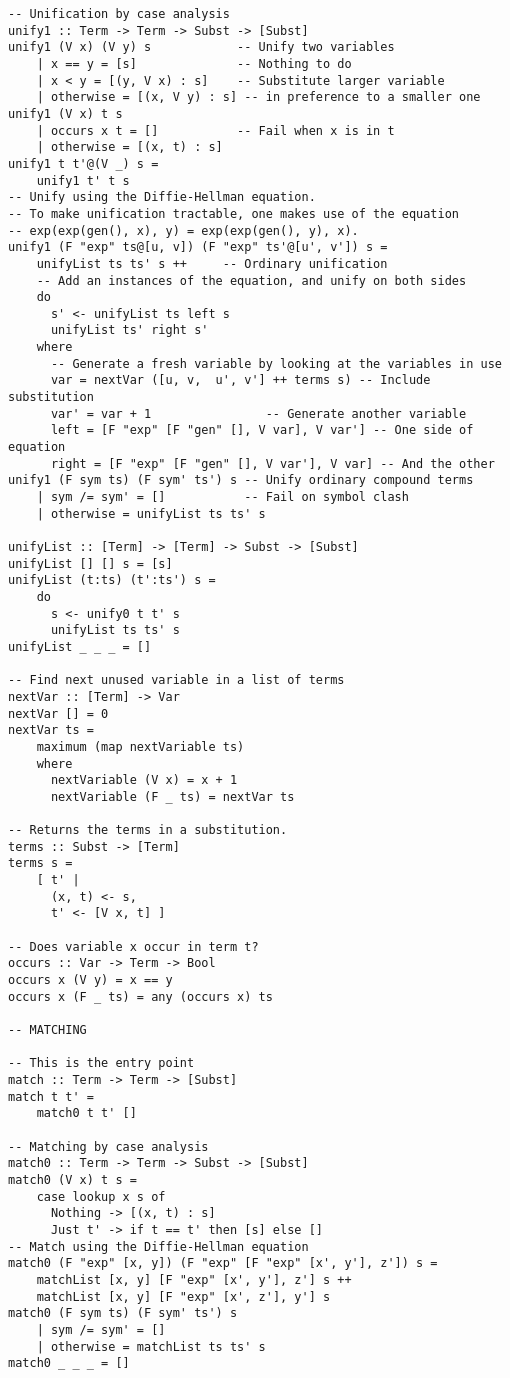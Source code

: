 \documentclass[12pt]{article}
\begin{document}
\begin{verbatim}
-- Unification by case analysis
unify1 :: Term -> Term -> Subst -> [Subst]
unify1 (V x) (V y) s            -- Unify two variables
    | x == y = [s]              -- Nothing to do
    | x < y = [(y, V x) : s]    -- Substitute larger variable
    | otherwise = [(x, V y) : s] -- in preference to a smaller one
unify1 (V x) t s
    | occurs x t = []           -- Fail when x is in t
    | otherwise = [(x, t) : s]
unify1 t t'@(V _) s =
    unify1 t' t s
-- Unify using the Diffie-Hellman equation.
-- To make unification tractable, one makes use of the equation
-- exp(exp(gen(), x), y) = exp(exp(gen(), y), x).
unify1 (F "exp" ts@[u, v]) (F "exp" ts'@[u', v']) s =
    unifyList ts ts' s ++     -- Ordinary unification
    -- Add an instances of the equation, and unify on both sides
    do
      s' <- unifyList ts left s
      unifyList ts' right s'
    where
      -- Generate a fresh variable by looking at the variables in use
      var = nextVar ([u, v,  u', v'] ++ terms s) -- Include  substitution
      var' = var + 1                -- Generate another variable
      left = [F "exp" [F "gen" [], V var], V var'] -- One side of equation
      right = [F "exp" [F "gen" [], V var'], V var] -- And the other
unify1 (F sym ts) (F sym' ts') s -- Unify ordinary compound terms
    | sym /= sym' = []           -- Fail on symbol clash
    | otherwise = unifyList ts ts' s

unifyList :: [Term] -> [Term] -> Subst -> [Subst]
unifyList [] [] s = [s]
unifyList (t:ts) (t':ts') s =
    do
      s <- unify0 t t' s
      unifyList ts ts' s
unifyList _ _ _ = []

-- Find next unused variable in a list of terms
nextVar :: [Term] -> Var
nextVar [] = 0
nextVar ts =
    maximum (map nextVariable ts)
    where
      nextVariable (V x) = x + 1
      nextVariable (F _ ts) = nextVar ts

-- Returns the terms in a substitution.
terms :: Subst -> [Term]
terms s =
    [ t' |
      (x, t) <- s,
      t' <- [V x, t] ]

-- Does variable x occur in term t?
occurs :: Var -> Term -> Bool
occurs x (V y) = x == y
occurs x (F _ ts) = any (occurs x) ts

-- MATCHING

-- This is the entry point
match :: Term -> Term -> [Subst]
match t t' =
    match0 t t' []

-- Matching by case analysis
match0 :: Term -> Term -> Subst -> [Subst]
match0 (V x) t s =
    case lookup x s of
      Nothing -> [(x, t) : s]
      Just t' -> if t == t' then [s] else []
-- Match using the Diffie-Hellman equation
match0 (F "exp" [x, y]) (F "exp" [F "exp" [x', y'], z']) s =
    matchList [x, y] [F "exp" [x', y'], z'] s ++
    matchList [x, y] [F "exp" [x', z'], y'] s
match0 (F sym ts) (F sym' ts') s
    | sym /= sym' = []
    | otherwise = matchList ts ts' s
match0 _ _ _ = []


\end{verbatim}
\end{document}
